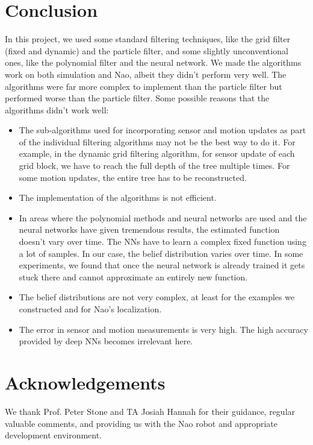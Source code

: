 \documentclass[letterpaper]{article} %
\begin{document}
\section{Conclusion}
In this project, we used some standard filtering techniques, like the grid filter (fixed and dynamic) and the particle filter, and some slightly unconventional ones, like the polynomial filter and the neural network. We made the algorithms work on both simulation and Nao, albeit they didn't perform very well. The algorithms were far more complex to implement than the particle filter but performed worse than the particle filter. Some possible reasons that the algorithms didn't work well:
\begin{itemize}
    \item The sub-algorithms used for incorporating sensor and motion updates as part of the individual filtering algorithms may not be the best way to do it. For example, in the dynamic grid filtering algorithm, for sensor update of each grid block, we have to reach the full depth of the tree multiple times. For some motion updates, the entire tree has to be reconstructed.
    \item The implementation of the algorithms is not efficient.
    \item In areas where the polynomial methods and neural networks are used and the neural networks have given tremendous results, the estimated function doesn't vary over time. The NNs have to learn a complex fixed function using a lot of samples. In our case, the belief distribution varies over time. In some experiments, we found that once the neural network is already trained it gets stuck there and cannot approximate an entirely new function.
    \item The belief distributions are not very complex, at least for the examples we constructed and for Nao's localization.
    \item The error in sensor and motion measurements is very high. The high accuracy provided by deep NNs becomes irrelevant here.
\end{itemize}

\section{Acknowledgements}
We thank Prof. Peter Stone and TA Josiah Hannah for their guidance, regular valuable comments, and providing us with the Nao robot and appropriate development environment.





\end{document}
